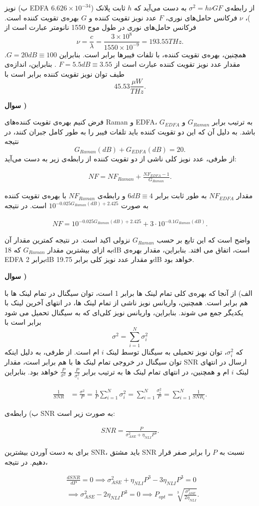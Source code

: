 \documentclass[10pt,letterpaper]{article}
\newcounter{questionnumber}
\newcommand{\Q}{
\textbf{سوال \thequestionnumber)}
\stepcounter{questionnumber}
}
\newcommand{\eqn}[1]{
\[
\begin{split}
#1
\end{split}
\]
}
\begin{document}
ب) نویز EDFA از رابطه‌ی 
$
\sigma^2=h\nu GF
$
به دست می‌آید که
$
h
$
ثابت پلانک ($6.626\times 10^{-34}$)، 
$
\nu
$
فرکانس حامل‌های نوری،
$
F
$
عدد نویز تقویت کننده و 
$
G
$
بهره‌ی تقویت کننده است. فرکانس حامل‌های نوری در طول موج 1550 نانومتر عبارت است از
$$
\nu=\frac{c}{\lambda}=\frac{3\times10^8}{1550\times 10^{-9}}=193.55THz
.
$$
همچنین، بهره‌ی تقویت کننده، با تلفات فیبرها برابر است. بنابراین
$
G=20dB\equiv 100
$.
مقدار عدد نویز تقویت کننده عبارت است از
$
F=5.5dB\equiv 3.55
$
.
بنابراین، اندازه‌ی طیف توان نویز تقویت کننده برابر است با
$$
45.53\frac{\mu W}{THz}.
$$

\Q

فرض کنیم بهره‌ی تقویت کننده‌های Raman و EDFA، به ترتیب برابر
$
G_{Raman}
$
و
$
G_{EDFA}
$
باشد. به دلیل آن که این دو تقویت کننده باید تلفات فیبر را به طور کامل جبران کنند، در نتیجه 
$$
G_{Raman}(dB)+G_{EDFA}(dB)=20.
$$
از طرفی، عدد نویز کلی ناشی از دو تقویت کننده از رابطه‌ی زیر به دست می‌آید:
\eqn{
NF=NF_{Raman}+\frac{NF_{EDFA}-1}{G_{Raman}}.
}
مقدار 
$
NF_{EDFA}
$
به طور ثابت برابر
$
6dB\equiv 4
$
و رابطه‌ی
$
NF_{Raman}
$
با بهره‌ی تقویت کننده به صورت 
$
10^{-0.025G_{Raman}(dB)+2.425}
$
است. در نتیجه
\eqn{
NF=
10^{-0.025G_{Raman}(dB)+2.425}
+3\cdot 10^{-0.1G_{Raman}(dB)}.
}
واضح است که این تابع بر حسب 
$
G_{Raman}
$
نزولی اکید است. در نتیجه کمترین مقدار آن به ازای بیشترین مقدار 
$
G_{Raman}
$
که 
18dB
است، اتفاق می افتد. بنابراین، مقدار بهره‌ی 
EDFA
برابر
2dB
و مقدار عدد نویز کلی برابر 
19.75dB
خواهد بود.

\Q

الف) از آنجا که بهره‌ی کلی تمام لینک ها برابر 1 است، توان سیگنال در تمام لینک ها با هم برابر است. همچنین، واریانس نویز ناشی از تمام لینک ها، در انتهای آخرین لینک با یکدیگر جمع می شوند. بنابراین، واریانس نویز کلی‌ای که به سیگنال تحمیل می شود برابر است با
$$
\sigma^2=\sum_{i=1}^N\sigma^2_i
$$
که
$
\sigma^2_i
$،
توان نویز تحمیلی به سیگنال توسط لینک 
$
i
$
ام است. از طرفی، به دلیل اینکه توان سیگنال در خروجی تمام لینک ها با هم برابر است، مقدار SNR ارسال در انتهای لینک 
$
i
$
ام و همچنین، در انتهای تمام لینک ها به ترتیب برابر 
$
\frac{P}{\sigma^2_i}
$
و
$
\frac{P}{\sigma^2}
$
خواهد بود. بنابراین
\eqn{
\frac{1}{SNR}&=\frac{\sigma^2}{P}=\frac{1}{P}\sum_{i=1}^N\sigma^2_i=\sum_{i=1}^N\frac{\sigma^2_i}{P}=\sum_{i=1}^N\frac{1}{SNR_i}.
}

ب) رابطه‌ی 
SNR
به صورت زیر است:
\eqn{
SNR=\frac{P}{\sigma^2_{ASE}+\eta_{NLI}P^3}
.
}
برای به دست آوردن بیشترین SNR، باید مشتق SNR نسبت به $P$ را برابر صفر قرار دهیم. در نتیجه،
\eqn{
&\frac{d SNR}{dP}=0\implies
\sigma^2_{ASE}+\eta_{NLI}P^3-3\eta_{NLI}P^3=0
\\&\implies
\sigma^2_{ASE}-2\eta_{NLI}P^3=0
\implies
P_{opt}=\sqrt[3]{\frac{\sigma^2_{ASE}}{2\eta_{NLI}}}.
}
\end{document}
